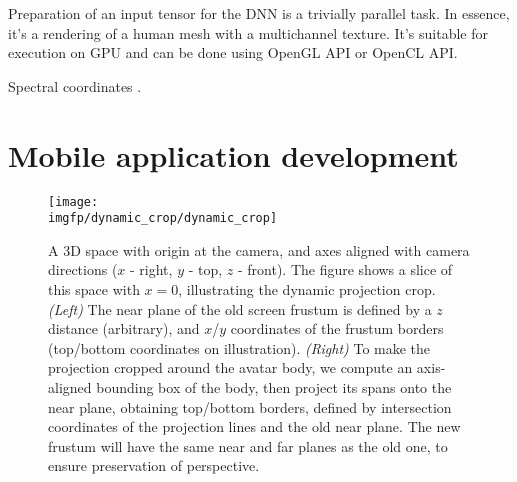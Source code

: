 Preparation of an input tensor for the DNN is a trivially parallel task. In essence, it's a rendering of a human mesh with a multichannel texture. It's suitable for execution on GPU and can be done using OpenGL API or OpenCL API.

Spectral coordinates \cite{aux:spectral10}.

\section{Mobile application development}
\label{methods:app}
\begin{figure}
	\centering
	\texttt{[image: \\imgfp/dynamic\_crop/dynamic\_crop]}
	\caption{A 3D space with origin at the camera, and axes aligned with camera directions ($x$ - right, $y$ - top, $z$ - front). The figure shows a slice of this space with $x=0$, illustrating the dynamic projection crop. \textit{(Left)} The near plane of the old screen frustum is defined by a $z$ distance (arbitrary), and $x$/$y$ coordinates of the frustum borders (top/bottom coordinates on illustration). \textit{(Right)} To make the projection cropped around the avatar body, we compute an axis-aligned bounding box of the body, then project its spans onto the near plane, obtaining top/bottom borders, defined by intersection coordinates of the projection lines and the old near plane. The new frustum will have the same near and far planes as the old one, to ensure preservation of perspective.}
	\label{fig:dynamic_crop_math}
\end{figure}

